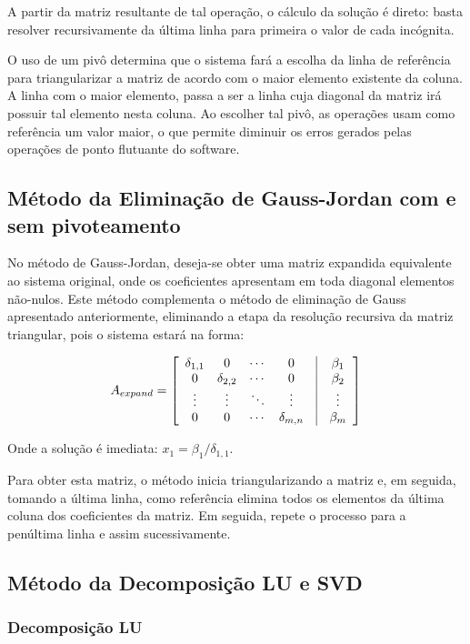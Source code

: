\documentclass[a4paper,10pt]{report}
\begin{document}
A partir da matriz resultante de tal operação, o cálculo da solução é direto: basta resolver recursivamente da última linha para primeira o valor de cada incógnita.

O uso de um pivô determina que o sistema fará a escolha da linha de referência para triangularizar a matriz de acordo com o maior elemento existente da coluna. A linha com o maior elemento, passa a ser a linha cuja diagonal da matriz irá possuir tal elemento nesta coluna. Ao escolher tal pivô, as operações usam como referência um valor maior, o que permite diminuir os erros gerados pelas operações de ponto flutuante do software.

\subsection{Método da Eliminação de Gauss-Jordan com e sem pivoteamento}

No método de Gauss-Jordan, deseja-se obter uma matriz expandida equivalente ao sistema original, onde os coeficientes apresentam em toda diagonal elementos não-nulos. Este método complementa o método de eliminação de Gauss apresentado anteriormente, eliminando a etapa da resolução recursiva da matriz triangular, pois o sistema estará na forma:

\[
A_{expand} = \left[ \begin{array}{cccccc}
\delta_{1,1} & 0 & \cdots & 0 & \vline & \beta_{1} \\
0 & \delta_{2,2} & \cdots & 0 & \vline & \beta_{2} \\
\vdots  & \vdots & \ddots & \vdots & \vline & \vdots \\
0 & 0 & \cdots & \delta_{m,n} & \vline & \beta_{m} 
\label{arr:triangular}
\end{array}\right]
\]

Onde a solução é imediata: $x_{1} = \beta_{1}/\delta_{1,1}$.

Para obter esta matriz, o método inicia triangularizando a matriz e, em seguida, tomando a última linha, como referência elimina todos os elementos da última coluna dos coeficientes da matriz. Em seguida, repete o processo para a penúltima linha e assim sucessivamente.

\subsection{Método da Decomposição LU e SVD}

\subsubsection{Decomposição LU}
\end{document}
